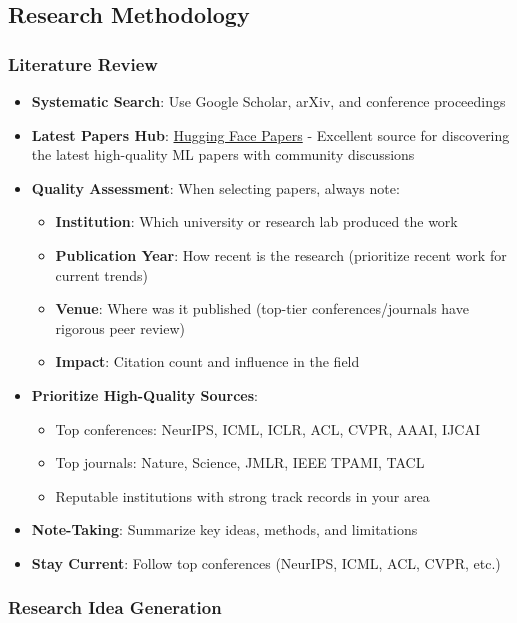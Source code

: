 \documentclass[11pt,a4paper]{article}
\begin{document}
\subsection{Research Methodology}

\subsubsection{Literature Review}
\begin{itemize}
    \item \textbf{Systematic Search}: Use Google Scholar, arXiv, and conference proceedings
    \item \textbf{Latest Papers Hub}: \href{https://huggingface.co/papers}{Hugging Face Papers} - Excellent source for discovering the latest high-quality ML papers with community discussions
    \item \textbf{Quality Assessment}: When selecting papers, always note:
    \begin{itemize}
        \item \textbf{Institution}: Which university or research lab produced the work
        \item \textbf{Publication Year}: How recent is the research (prioritize recent work for current trends)
        \item \textbf{Venue}: Where was it published (top-tier conferences/journals have rigorous peer review)
        \item \textbf{Impact}: Citation count and influence in the field
    \end{itemize}
    \item \textbf{Prioritize High-Quality Sources}:
    \begin{itemize}
        \item Top conferences: NeurIPS, ICML, ICLR, ACL, CVPR, AAAI, IJCAI
        \item Top journals: Nature, Science, JMLR, IEEE TPAMI, TACL
        \item Reputable institutions with strong track records in your area
    \end{itemize}
    \item \textbf{Note-Taking}: Summarize key ideas, methods, and limitations
    \item \textbf{Stay Current}: Follow top conferences (NeurIPS, ICML, ACL, CVPR, etc.)
\end{itemize}

\subsubsection{Research Idea Generation}
\end{document}
